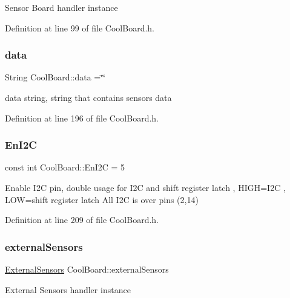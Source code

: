 Sensor Board handler instance 

Definition at line 99 of file Cool\+Board.\+h.

\mbox{\label{class_cool_board_a427fb753dd8575bdf821c70a5c63d695}} 
\subsubsection{\texorpdfstring{data}{data}}
{\footnotesize\ttfamily String Cool\+Board\+::data =\char`\"{}\char`\"{}\hspace{0.3cm}{\ttfamily [private]}}

data string, string that contains sensors data 

Definition at line 196 of file Cool\+Board.\+h.

\mbox{\label{class_cool_board_af1fe1376fc66f93dee80b327ca695377}} 
\subsubsection{\texorpdfstring{En\+I2C}{EnI2C}}
{\footnotesize\ttfamily const int Cool\+Board\+::\+En\+I2C = 5\hspace{0.3cm}{\ttfamily [private]}}

Enable I2C pin, double usage for I2C and shift register latch , H\+I\+GH=I2C , L\+OW=shift register latch All I2C is over pins (2,14) 

Definition at line 209 of file Cool\+Board.\+h.

\mbox{\label{class_cool_board_a09e26264839c65873eb56af476eff6b2}} 
\subsubsection{\texorpdfstring{external\+Sensors}{externalSensors}}
{\footnotesize\ttfamily \hyperlink{class_external_sensors}{External\+Sensors} Cool\+Board\+::external\+Sensors\hspace{0.3cm}{\ttfamily [private]}}

External Sensors handler instance 

